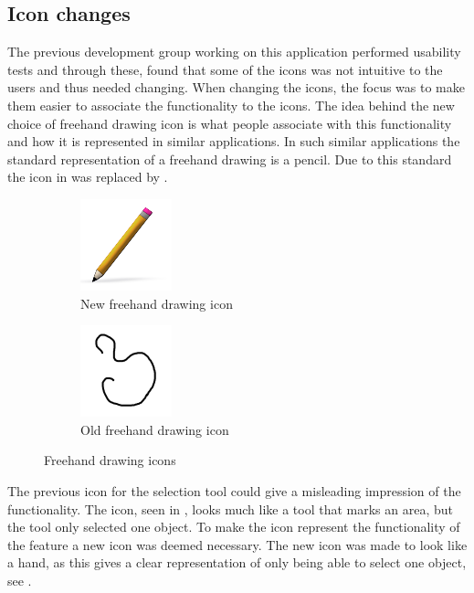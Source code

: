 \subsection{Icon changes}
The previous development group working on this application \citep{misc:crocold} performed usability tests and through these, found that some of the icons was not intuitive to the users and thus needed changing.
When changing the icons, the focus was to make them easier to associate the functionality to the icons.
The idea behind the new choice of freehand drawing icon is what people associate with this functionality and how it is represented in similar applications.
In such similar applications the standard representation of a freehand drawing is a pencil.
Due to this standard the icon in  was replaced by .

\begin{figure}[h]
	\centering
	\begin{subfigure}[b]{0.45\textwidth}
		\centering
		\includegraphics[scale = 1]{media/freehandNew}
		\caption{New freehand drawing icon}
		\label{figure:new-freehand}
	\end{subfigure}
	\qquad
	\begin{subfigure}[b]{0.45\textwidth}
		\centering
		\includegraphics[scale = 0.1]{media/freehandOld}
		\caption{Old freehand drawing icon}
		\label{figure:old-freehand}
	\end{subfigure}
	\caption{Freehand drawing icons}
	\label{figure:freehand}
\end{figure}

The previous icon for the selection tool could give a misleading impression of the functionality.
The icon, seen in , looks much like a tool that marks an area, but the tool only selected one object.
To make the icon represent the functionality of the feature a new icon was deemed necessary.
The new icon was made to look like a hand, as this gives a clear representation of only being able to select one object, see .

